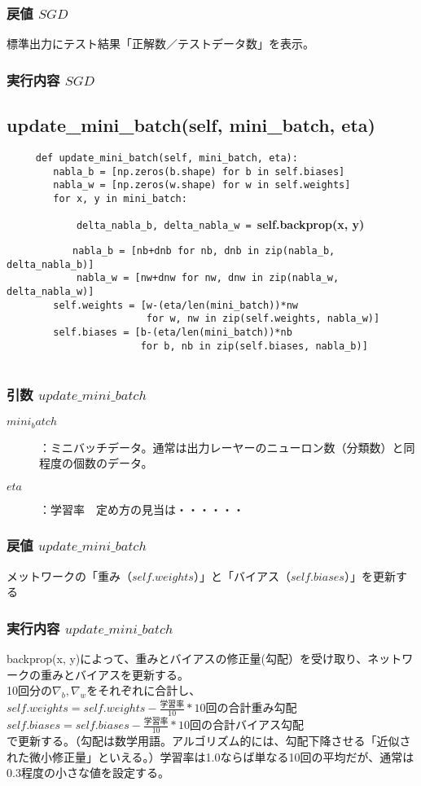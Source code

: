 \documentclass[11pt,a4j,fleqn]{jarticle}
\begin{document}
\subsubsection{戻値 $SGD$}
標準出力にテスト結果「正解数／テストデータ数」を表示。
\subsubsection{実行内容 $SGD$}

\subsection{update\_mini\_batch(self, mini\_batch, eta)}
\begin{verbatim}
     def update_mini_batch(self, mini_batch, eta):
        nabla_b = [np.zeros(b.shape) for b in self.biases]
        nabla_w = [np.zeros(w.shape) for w in self.weights]
        for x, y in mini_batch:
\end{verbatim}
\verb|            delta_nabla_b, delta_nabla_w = |{\Large \bf self.backprop(x, y)}
\begin{verbatim}
        　　nabla_b = [nb+dnb for nb, dnb in zip(nabla_b, delta_nabla_b)]
            nabla_w = [nw+dnw for nw, dnw in zip(nabla_w, delta_nabla_w)]
        self.weights = [w-(eta/len(mini_batch))*nw
                        for w, nw in zip(self.weights, nabla_w)]
        self.biases = [b-(eta/len(mini_batch))*nb
                       for b, nb in zip(self.biases, nabla_b)]
                     
\end{verbatim}
\subsubsection{引数 $update\_mini\_batch$}
\begin{description}
  \item [$mini_batch$] ：ミニバッチデータ。通常は出力レーヤーのニューロン数（分類数）と同程度の個数のデータ。
  \item[$eta$] ：学習率　定め方の見当は・・・・・・
\end{description}
\subsubsection{戻値 $update\_mini\_batch$}
メットワークの「重み（$self.weights$）」と「バイアス（$self.biases$）」を更新する
\subsubsection{実行内容 $update\_mini\_batch$}
backprop(x, y)によって、重みとバイアスの修正量(勾配）を受け取り、ネットワークの重みとバイアスを更新する。\\
10回分の$\nabla_b, \nabla_w$をそれぞれに合計し、\\
$self.weights = self.weights - \frac{学習率}{10} * 10回の合計重み勾配$ \\
$self.biases = self.biases - \frac{学習率}{10} * 10回の合計バイアス勾配$\\
で更新する。（勾配は数学用語。アルゴリズム的には、勾配下降させる「近似された微小修正量」といえる。）学習率は1.0ならば単なる10回の平均だが、通常は0.3程度の小さな値を設定する。\\
\end{document}
